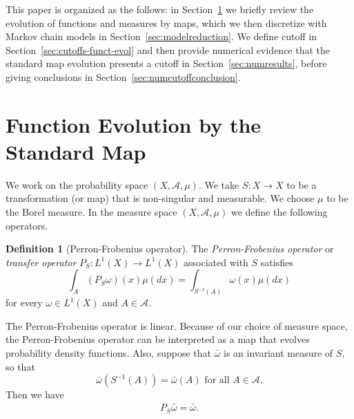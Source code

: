 \documentclass{aims}
\theoremstyle{definition}
\newtheorem{definition}[theorem]{Definition}
\begin{document}
This paper is organized as the follows: in Section~\ref{sec:evolution}
we briefly review the evolution of functions and measures by maps,
which we then discretize with Markov chain models in
Section~\ref{sec:modelreduction}. We define cutoff in
Section~\ref{sec:cutoffs-funct-evol} and then provide numerical
evidence that the standard map evolution presents a cutoff in
Section~\ref{sec:numresults}, before giving conclusions in
Section~\ref{sec:numcutoffconclusion}.


\section{Function Evolution by the Standard Map}
\label{sec:evolution}

We work on the probability space $(X,\mathcal{A},\mu)$. We take $S: X
\to X$ to be a transformation (or map) that is non-singular and
measurable. We choose $\mu$ to be the Borel measure. In the measure
space $(X,\mathcal{A},\mu)$ we define the following operators.

\begin{definition}[Perron-Frobenius operator]
  The \emph{Perron-Frobenius operator} or \emph{transfer operator}
  $P_S : L^1(X) \to L^1(X)$ associated with $S$ satisfies
\begin{equation}
  \int_A (P_S \omega)(x)\mu(dx) = \int_{S^{-1}(A)} \omega(x)\mu(dx)
\end{equation}
for every $\omega \in L^1(X)$ and $A \in \mathcal{A}$.
\end{definition}

The Perron-Frobenius operator is linear. Because of our choice of
measure space, the Perron-Frobenius operator can be interpreted as a
map that evolves probability density functions. Also, suppose that
$\bar{\omega}$ is an invariant measure of $S$, so that
\begin{equation}
   \bar{\omega}(S^{-1}(A)) = \bar{\omega}(A)  \text{ for all } A \in \mathcal{A}.
\end{equation}
Then we have
\begin{eqnarray}
  P_S \bar{\omega} = \bar{\omega}.
\end{eqnarray}
\end{document}
